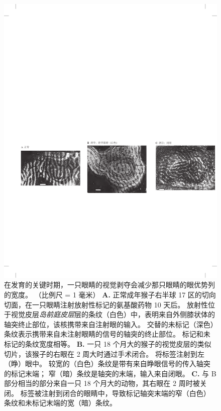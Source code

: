 \begin{figure}[htbp]
	\centering
	\includegraphics[width=1.0\linewidth]{chap49/fig_49_4}
	\caption{在发育的关键时期，一只眼睛的视觉剥夺会减少那只眼睛的眼优势列的宽度。
		（比例尺 = 1 毫米）\cite{hubel1977ferrier}
		\textbf{A.} 正常成年猴子右半球 17 区的切向切面，在一只眼睛注射放射性标记的氨基酸药物 10 天后。
		放射性位于视觉皮层\textit{岛前庭皮层}层的条纹（白色）中，表明来自外侧膝状体的轴突终止部位，该核携带来自注射眼的输入。
		交替的未标记（深色）条纹表示携带来自未注射眼睛的信号的轴突的终止部位。
		标记和未标记的条纹宽度相等。
		\textbf{B.} 一只 18 个月大的猴子的视觉皮层的类似切片，该猴子的右眼在 2 周大时通过手术闭合。
		将标签注射到左（睁）眼中。
		较宽的（白色）条纹是带有来自睁眼信号的传入轴突的标记末端； 窄（暗）条纹是轴突的末端，输入来自闭眼。
		\textbf{C.} 与 B 部分相当的部分来自一只 18 个月大的动物，其右眼在 2 周时被关闭。
		标签被注射到闭合的眼睛中，导致标记轴突末端的窄（白色）条纹和未标记末端的宽（暗）条纹。}
	\label{fig:49_4}
\end{figure}


